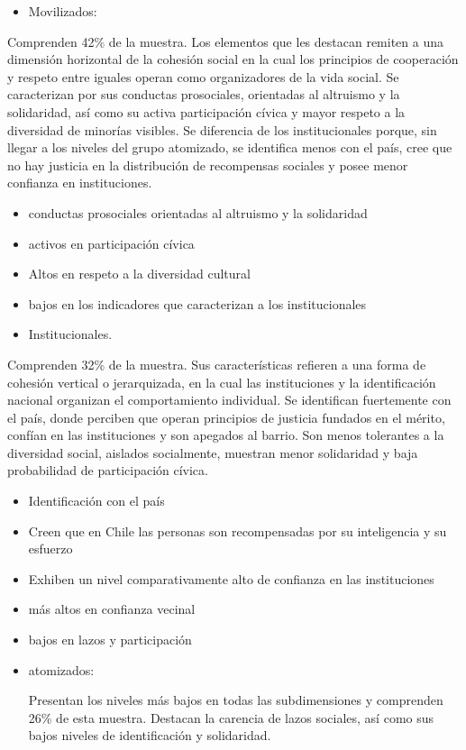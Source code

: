 \documentclass[
  12pt,
]{book}
\providecommand{\tightlist}{%
  \setlength{\itemsep}{0pt}\setlength{\parskip}{0pt}}
\begin{document}
\begin{itemize}
\tightlist
\item
  Movilizados:
\end{itemize}

Comprenden 42\% de la muestra. Los elementos que les destacan remiten a una dimensión horizontal de la cohesión social en la cual los principios de cooperación y respeto entre iguales operan como organizadores de la vida social. Se caracterizan por sus conductas prosociales, orientadas al altruismo y la solidaridad, así como su activa participación cívica y mayor respeto a la diversidad de minorías visibles. Se diferencia de los institucionales porque, sin llegar a los niveles del grupo atomizado, se identifica menos con el país, cree que no hay justicia en la distribución de recompensas sociales y posee menor confianza en instituciones.

\begin{itemize}
\item
  conductas prosociales orientadas al altruismo y la solidaridad
\item
  activos en participación cívica
\item
  Altos en respeto a la diversidad cultural
\item
  bajos en los indicadores que caracterizan a los institucionales
\item
  Institucionales.
\end{itemize}

Comprenden 32\% de la muestra. Sus características refieren a una forma de cohesión vertical o jerarquizada, en la cual las instituciones y la identificación nacional organizan el comportamiento individual. Se identifican fuertemente con el país, donde perciben que operan principios de justicia fundados en el mérito, confían en las instituciones y son apegados al barrio. Son menos tolerantes a la diversidad social, aislados socialmente, muestran menor solidaridad y baja probabilidad de participación cívica.

\begin{itemize}
\item
  Identificación con el país
\item
  Creen que en Chile las personas son recompensadas por su inteligencia y su esfuerzo
\item
  Exhiben un nivel comparativamente alto de confianza en las instituciones
\item
  más altos en confianza vecinal
\item
  bajos en lazos y participación
\item
  atomizados:

  Presentan los niveles más bajos en todas las subdimensiones y comprenden 26\% de esta muestra. Destacan la carencia de lazos sociales, así como sus bajos niveles de identificación y solidaridad.
\end{itemize}
\end{document}
